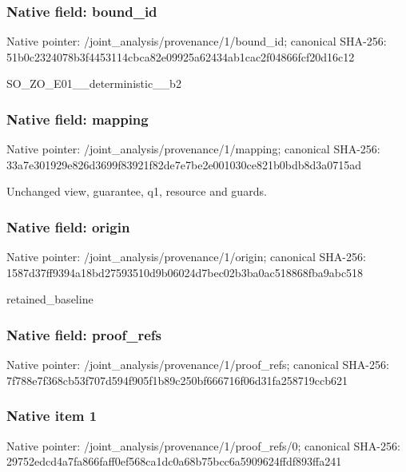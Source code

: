 \documentclass[10pt,a4paper]{article}
\begin{document}
\subsubsection{Native field: bound\_\allowbreak{}id}
Native pointer: /joint\_\allowbreak{}analysis/provenance/1/bound\_\allowbreak{}id; canonical SHA-256: 51b0c2324078b3f4453114cbca82e09925a62434ab1cac2f04866fcf20d16c12

\begingroup\raggedright\sloppy SO\_\allowbreak{}ZO\_\allowbreak{}E01\_\allowbreak{}\_\allowbreak{}deterministic\_\allowbreak{}\_\allowbreak{}b2\par\endgroup

\subsubsection{Native field: mapping}
Native pointer: /joint\_\allowbreak{}analysis/provenance/1/mapping; canonical SHA-256: 33a7e301929e826d3699f83921f82de7e7be2e001030ce821b0bdb8d3a0715ad

\begingroup\raggedright\sloppy Unchanged view,\allowbreak{} guarantee,\allowbreak{} q1,\allowbreak{} resource and guards.\par\endgroup

\subsubsection{Native field: origin}
Native pointer: /joint\_\allowbreak{}analysis/provenance/1/origin; canonical SHA-256: 1587d37ff9394a18bd27593510d9b06024d7bec02b3ba0ac518868fba9abc518

\begingroup\raggedright\sloppy retained\_\allowbreak{}baseline\par\endgroup

\subsubsection{Native field: proof\_\allowbreak{}refs}
Native pointer: /joint\_\allowbreak{}analysis/provenance/1/proof\_\allowbreak{}refs; canonical SHA-256: 7f788e7f368cb53f707d594f905f1b89c250bf666716f06d31fa258719ccb621

\subsubsection{Native item 1}
Native pointer: /joint\_\allowbreak{}analysis/provenance/1/proof\_\allowbreak{}refs/0; canonical SHA-256: 29752edcd4a7fa866faff0ef568ca1dc0a68b75bcc6a5909624ffdf893ffa241
\end{document}
